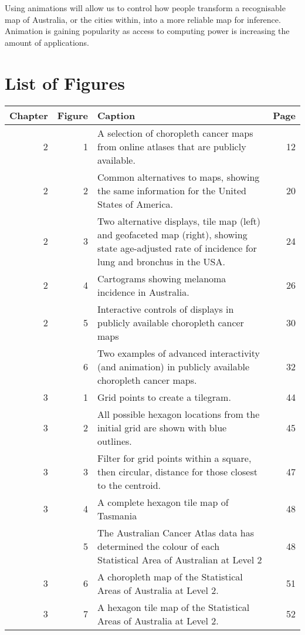\documentclass{monashthesis}
\begin{document}
Using animations will allow us to control how people transform a recognisable map of Australia, or the cities within, into a more reliable map for inference. Animation is gaining popularity as access to computing power is increasing the amount of applications.

\newpage

\hypertarget{list-of-figures}{%
\chapter*{List of Figures}\label{list-of-figures}}

\begin{tabular}{rr>{\raggedright\arraybackslash}p{20em}r}
\toprule
Chapter & Figure & Caption & Page\\
\midrule
2 & 1 & A selection of choropleth cancer maps from online atlases that are publicly available. & 12\\
2 & 2 & Common alternatives to maps, showing the same information for the United States of America. & 20\\
2 & 3 & Two alternative displays, tile map (left) and geofaceted map (right), showing state age-adjusted rate of incidence for lung and bronchus in the USA. & 24\\
2 & 4 & Cartograms showing melanoma incidence in Australia. & 26\\
2 & 5 & Interactive controls of displays in publicly available choropleth cancer maps & 30\\
\addlinespace
2 & 6 & Two examples of advanced interactivity (and animation) in publicly available choropleth cancer maps. & 32\\
3 & 1 & Grid points to create a tilegram. & 44\\
3 & 2 & All possible hexagon locations from the initial grid are shown with blue outlines. & 45\\
3 & 3 & Filter for grid points within a square, then circular, distance for those closest to the centroid. & 47\\
3 & 4 & A complete hexagon tile map of Tasmania & 48\\
\addlinespace
3 & 5 & The Australian Cancer Atlas data has determined the colour of each Statistical Area of Australian at Level 2 & 48\\
3 & 6 & A choropleth map of the Statistical Areas of Australia at Level 2. & 51\\
3 & 7 & A hexagon tile map of the Statistical Areas of Australia at Level 2. & 52\\

\end{tabular}
\end{document}
